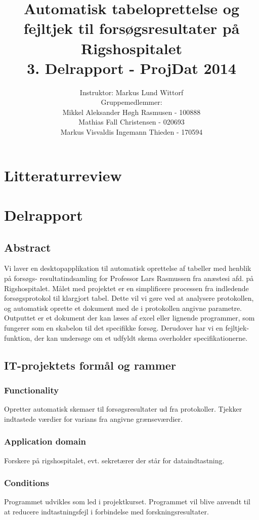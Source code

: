 \documentclass[11pt]{article}
\title{Automatisk tabeloprettelse og fejltjek til forsøgsresultater på Rigshospitalet\\
3. Delrapport - ProjDat 2014}
\author{Instruktor: Markus Lund Wittorf \\Gruppemedlemmer: \\ Mikkel Aleksander Høgh Rasmusen - 100888 \\ Mathias Fall Christensen - 020693 \\ Markus Visvaldis Ingemann Thieden - 170594}
\date{}
\begin{document}
\maketitle
\pagebreak
\tableofcontents
\pagebreak
\section{Litteraturreview}

\pagebreak
\section{Delrapport}
\subsection{Abstract}
Vi laver en desktopapplikation til automatisk oprettelse af tabeller med henblik på forsøgs- resultatindsamling for Professor Lars Rasmussen fra anæstesi afd. på Rigshospitalet. Målet med projektet er en simplificere processen fra indledende forsøgsprotokol til klargjort tabel. Dette vil vi gøre ved at analysere protokollen, og automatisk oprette et dokument med de i protokollen angivne parametre. Outputtet er et dokument der kan læses af excel eller lignende programmer, som fungerer som en skabelon til det specifikke forsøg. Derudover har vi en fejltjek-funktion, der kan undersøge om et udfyldt skema overholder specifikationerne.


\subsection{IT-projektets formål og rammer}
\subsubsection{Functionality}
Opretter automatisk skemaer til forsøgsresultater ud fra protokoller. Tjekker indtastede værdier for varians fra angivne grænseværdier.
\subsubsection{Application domain}
Forskere på rigshospitalet, evt. sekretærer der står for dataindtastning.
\subsubsection{Conditions}
Programmet udvikles som led i projektkurset. Programmet vil blive anvendt til at reducere indtastningsfejl i forbindelse med forskningsresultater.
\end{document}
